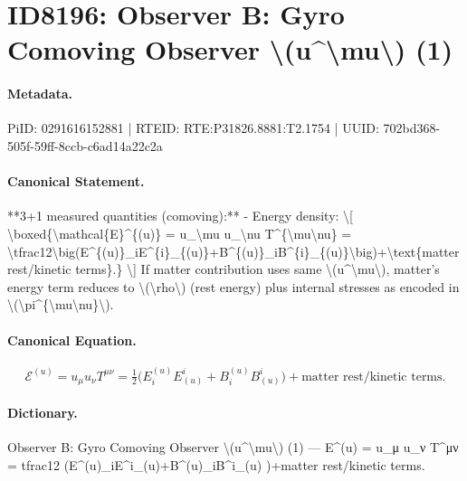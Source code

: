 \section*{ID8196: Observer B: Gyro Comoving Observer \textbackslash{}(u\textasciicircum{}\textbackslash{}mu\textbackslash{}) (1)}
\paragraph{Metadata.}
PiID: 0291616152881 | RTEID: RTE:P31826.8881:T2.1754 | UUID: 702bd368-505f-59ff-8ccb-c6ad14a22c2a

\paragraph{Canonical Statement.}
**3+1 measured quantities (comoving):** - Energy density: \textbackslash{}[ \textbackslash{}boxed\{\textbackslash{}mathcal\{E\}\textasciicircum{}\{(u)\} = u\_\textbackslash{}mu u\_\textbackslash{}nu T\textasciicircum{}\{\textbackslash{}mu\textbackslash{}nu\} = \textbackslash{}tfrac12\textbackslash{}big(E\textasciicircum{}\{(u)\}\_iE\textasciicircum{}\{i\}\_\{(u)\}+B\textasciicircum{}\{(u)\}\_iB\textasciicircum{}\{i\}\_\{(u)\}\textbackslash{}big)+\textbackslash{}text\{matter rest/kinetic terms\}.\} \textbackslash{}] If matter contribution uses same \textbackslash{}(u\textasciicircum{}\textbackslash{}mu\textbackslash{}), matter's energy term reduces to \textbackslash{}(\textbackslash{}rho\textbackslash{}) (rest energy) plus internal stresses as encoded in \textbackslash{}(\textbackslash{}pi\textasciicircum{}\{\textbackslash{}mu\textbackslash{}nu\}\textbackslash{}).

\paragraph{Canonical Equation.}
\[
\boxed{\mathcal{E}^{(u)} = u_\mu u_\nu T^{\mu\nu} = \tfrac12\big(E^{(u)}_iE^{i}_{(u)}+B^{(u)}_iB^{i}_{(u)}\big)+\text{matter rest/kinetic terms}.}
\]

\paragraph{Dictionary.}
Observer B: Gyro Comoving Observer \textbackslash{}(u\textasciicircum{}\textbackslash{}mu\textbackslash{}) (1) — E\textasciicircum{}(u) = u\_μ u\_ν T\textasciicircum{}μν = tfrac12 (E\textasciicircum{}(u)\_iE\textasciicircum{}i\_(u)+B\textasciicircum{}(u)\_iB\textasciicircum{}i\_(u) )+matter rest/kinetic terms.

